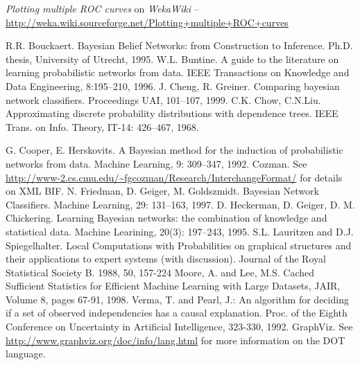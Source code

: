 \begin{thebibliography}{999}
		\textit{Plotting multiple ROC curves} on \textit{WekaWiki} -- \\
		\small{\url{http://weka.wiki.sourceforge.net/Plotting+multiple+ROC+curves}{}}

		R.R. Bouckaert. Bayesian Belief Networks: from Construction to Inference. 
		Ph.D. thesis, 
		University of Utrecht, 
		1995.
		W.L. Buntine. A guide to the literature on learning probabilistic networks from data.
		IEEE Transactions on Knowledge and Data Engineering, 8:195--210, 
		1996. 
		J. Cheng, R. Greiner. 
		Comparing bayesian network classifiers. 
		Proceedings UAI,
		101--107,
		1999.
		C.K. Chow, C.N.Liu.
		Approximating discrete probability distributions with dependence trees.
		IEEE Trans. on Info. Theory, IT-14: 426--467, 1968.

	\newpage

		G. Cooper, E. Herskovits. 
		A Bayesian method for the induction of probabilistic networks from data. 
		Machine Learning, 9: 309--347, 1992.
		Cozman.
		See {\sf \url{http://www-2.cs.cmu.edu/\~fgcozman/Research/InterchangeFormat/}{}}
		for details on XML BIF.
		N. Friedman, D. Geiger, M. Goldszmidt. 
		Bayesian Network Classifiers. 
		Machine Learning, 29: 131--163, 1997.
		D. Heckerman, D. Geiger, D. M. Chickering. 
		Learning Bayesian networks: the combination of knowledge and statistical data. 
		Machine Learining, 20(3): 197--243, 1995.
		S.L. Lauritzen and D.J. Spiegelhalter.
		Local Computations with Probabilities on graphical structures and their applications to expert systems (with discussion).
		Journal of the Royal Statistical Society B.
		1988, 50, 157-224
		Moore, A. and Lee, M.S. Cached Sufficient Statistics for Efficient Machine Learning with Large Datasets,
		JAIR, Volume 8, pages 67-91, 1998.
		Verma, T. and Pearl, J.:
		An algorithm for deciding if a set of observed independencies has a causal explanation.
		Proc. of the Eighth Conference on Uncertainty in Artificial Intelligence,
		323-330, 1992.
		GraphViz. See \url{http://www.graphviz.org/doc/info/lang.html}{} for
		more information on the DOT language.

\end{thebibliography}
